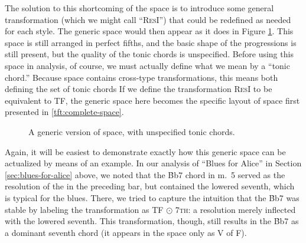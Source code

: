 {The solution to this shortcoming of the space is to introduce some general
transformation (which we might call ``\textsc{ResI}'') that could be redefined
as needed for each style. The generic space would then appear as it
does in Figure \ref{tfe:generic-space}. This space is still arranged in
perfect fifths, and the basic shape of the \tfo progressions is still present,
but the quality of the tonic chords is unspecified. Before using this space in
analysis, of course, we must actually define what we mean by a ``tonic
chord.'' Because \tf space contains cross-type transformations, this means
both defining the set of tonic chords
If we define the transformation \textsc{ResI} to be equivalent to TF,
the generic space here becomes the specific layout of \tf space first
presented in \ref{tft:complete-space}.

\begin{figure}[tbhp]
  \caption{A generic version of \tf space, with unspecified tonic chords.}
  \label{tfe:generic-space}
\end{figure}

Again, it will be easiest to demonstrate exactly how this generic space can be
actualized by means of an example. In our analysis of ``Blues for Alice'' in
Section \ref{sec:blues-for-alice} above, we noted that the \h{Bb7} chord in
m.~5 served as the resolution of the \tf in the preceding bar, but contained
the lowered seventh, which is typical for the blues. There, we tried to
capture the intuition that the \h{Bb7} was stable by labeling the
transformation as TF $\odot$ \textsc{7th}: a resolution merely inflected with
the lowered seventh. This transformation, though, still results in the \h{Bb7}
as a dominant seventh chord (it appears in the space only as V of F).

}

